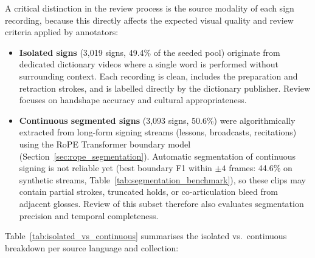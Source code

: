 A critical distinction in the review process is the source modality of each sign recording, because
this directly affects the expected visual quality and review criteria applied by annotators:

\begin{itemize}[leftmargin=*,itemsep=2pt]
  \item \textbf{Isolated signs} (3,019 signs, 49.4\% of the seeded pool) originate from dedicated
    dictionary videos where a single word is performed without surrounding context.  Each recording
    is clean, includes the preparation and retraction strokes, and is labelled directly by the
    dictionary publisher.  Review focuses on handshape accuracy and cultural appropriateness.
  \item \textbf{Continuous segmented signs} (3,093 signs, 50.6\%) were algorithmically extracted
    from long-form signing streams (lessons, broadcasts, recitations) using the RoPE Transformer
    boundary model (Section~\ref{sec:rope_segmentation}).  Automatic segmentation of continuous
    signing is not reliable yet (best boundary F1 within $\pm4$ frames: 44.6\% on synthetic streams,
    Table~\ref{tab:segmentation_benchmark}), so these clips may contain partial strokes, truncated
    holds, or co-articulation bleed from adjacent glosses.  Review of this subset therefore also evaluates segmentation precision
    and temporal completeness.
\end{itemize}

Table~\ref{tab:isolated_vs_continuous} summarises the isolated vs.\ continuous breakdown per
source language and collection:

